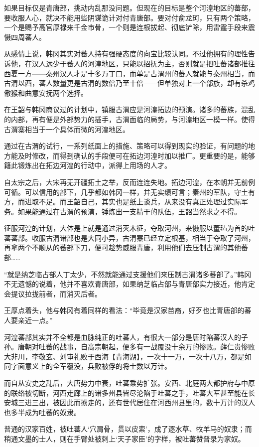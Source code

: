 如果目标仅是青唐部，挑动内乱那没问题。但现在的目标是整个河湟地区的蕃部，要收服人心，就决不能用些阴谋诡计对付青唐部。要对付俞龙珂，只有两个策略，一个是赐予高官厚禄来千金市骨，一个则是连根拔起、彻底铲除，用雷霆手段来震慑四周蕃人。

从感情上说，韩冈其实对蕃人持有强硬态度的向宝比较认同。不过他拥有的理性告诉他，在汉人远少于蕃人的河湟地区，只能以招抚为主，否则就是把吐蕃诸部推往西夏一方——秦州汉人才是十多万丁口，而单是古渭州的蕃人就能与秦州相当，而古渭以西，蕃人数量更是古渭的数倍乃至十倍——但单独对上一个部族，却有杀鸡儆猴和曲意安抚两个选择。

在王韶与韩冈商议过的计划中，镇服古渭应是河湟拓边的预演。诸多的蕃族，混乱的内部，再有便是外部势力的插手，古渭面临的局势，与河湟地区一模一样。使得古渭寨相当于一个具体而微的河湟地区。

通过在古渭的试行，一系列纸面上的措施、策略可以得到现实的验证，有问题的地方能及时修改，而得到确认的手段便可在拓边河湟时加以推广。更重要的是，能够籍此锻炼出在拓边河湟的行动中，派得上用场的人才。

自太宗之后，大宋再无开疆拓土之举，反而连连失地。拓边河湟，在本朝并无前例可循。可以信用的部下，几乎都如韩冈一样，并无实绩可言；秦州的军队，守土有方，而进取不足。而王韶自己，其实也是纸上谈兵，从来没有真正处理过实际军务。如果能通过在古渭的预演，锤炼出一支精干的队伍，王韶当然求之不得。

征服河湟的计划，大体是上就是通过消灭木征，夺取河州，来慑服以董毡为首的吐蕃蕃部。收服古渭诸部也是大同小异，古渭寨已经立定根基，相当于夺取了河州，再拿两个不顺从的蕃部下刀，便可趁势威服青唐，利用他们去压制古渭的其他蕃部……

“就是纳芝临占部人丁太少，不然就能通过支援他们来压制古渭诸多蕃部了。”韩冈不无遗憾的说着，他并不喜欢青唐部，如果纳芝临占部与青唐部实力接近，他肯定会提议拉拢前者，而消灭后者。

王厚点着头，他与韩冈有着同样的看法：“毕竟是汉家苗裔，好歹也比青唐部的蕃人要亲近一点。”

河湟蕃部其实并不全都是血脉纯正的吐蕃人，有很大一部分是唐时陷蕃汉人的子孙。唐朝对吐蕃的战事，自高宗朝起，便多有一战覆没十余万的惨败。薛仁贵惨败大非川，李敬玄、刘审礼败于西海【青海湖】，一次十一万，一次十八万，都是如同字面意义上的全军覆没，兵败被俘的将士数以万计。

而自从安史之乱后，大唐势力中衰，吐蕃乘势扩张。安西、北庭两大都护府与中原的联络被切断，河西走廊上的诸多州县皆尽沦陷于吐蕃之手，吐蕃大军甚至能在长安城三进三出，被因此而掳走的，还有世代居住在河西州县里的，数十万计的汉人也多半成为吐蕃的奴隶。

普通的汉家百姓，被吐蕃人‘穴肩骨，贯以皮索’，成了逐水草、牧羊马的奴隶；而稍通文墨的士人，则在手臂处被刺上‘天子家臣’的字样，被吐蕃赞普录为家奴。

